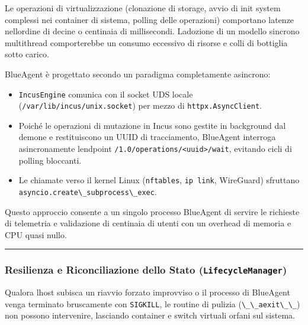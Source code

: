 Le operazioni di virtualizzazione (clonazione di storage, avvio di init
system complessi nei container di sistema, polling delle operazioni)
comportano latenze nell\textquotesingle ordine di decine o centinaia di
millisecondi. L\textquotesingle adozione di un modello sincrono
multithread comporterebbe un consumo eccessivo di risorse e colli di
bottiglia sotto carico.

BlueAgent è progettato secondo un paradigma completamente asincrono:

\begin{itemize}
\tightlist
\item
  \passthrough{\lstinline!IncusEngine!} comunica con il socket UDS
  locale (\passthrough{\lstinline!/var/lib/incus/unix.socket!}) per
  mezzo di \passthrough{\lstinline!httpx.AsyncClient!}.
\item
  Poiché le operazioni di mutazione in Incus sono gestite in background
  dal demone e restituiscono un UUID di tracciamento, BlueAgent
  interroga asincronamente l\textquotesingle endpoint
  \passthrough{\lstinline!/1.0/operations/<uuid>/wait!}, evitando cicli
  di polling bloccanti.
\item
  Le chiamate verso il kernel Linux (\passthrough{\lstinline!nftables!},
  \passthrough{\lstinline!ip link!}, WireGuard) sfruttano
  \passthrough{\lstinline!asyncio.create\_subprocess\_exec!}.
\end{itemize}

Questo approccio consente a un singolo processo BlueAgent di servire le
richieste di telemetria e validazione di centinaia di utenti con un
overhead di memoria e CPU quasi nullo.

\begin{center}\rule{0.5\linewidth}{0.5pt}\end{center}

\subsubsection{\texorpdfstring{Resilienza e Riconciliazione dello Stato
(\texttt{LifecycleManager})}{Resilienza e Riconciliazione dello Stato (LifecycleManager)}}\label{resilienza-e-riconciliazione-dello-stato-lifecyclemanager}

Qualora l\textquotesingle host subisca un riavvio forzato improvviso o
il processo di BlueAgent venga terminato bruscamente con
\passthrough{\lstinline!SIGKILL!}, le routine di pulizia
(\passthrough{\lstinline!\_\_aexit\_\_!}) non possono intervenire,
lasciando container e switch virtuali orfani sul sistema.

